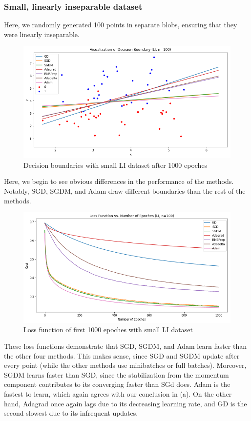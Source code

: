\documentclass[twoside,11pt]{homework}
\begin{document}
\subsubsection*{Small, linearly inseparable dataset}
Here, we randomly generated 100 points in separate blobs, ensuring that they were linearly inseparable.
\begin{figure}[H]
		\centering
		\includegraphics[scale=.5]{q5/insep_100/lines.png}
		\caption{Decision boundaries with small LI dataset after 1000 epoches}
	\end{figure}

Here, we begin to see obvious differences in the performance of the methods. Notably, SGD, SGDM, and Adam draw different boundaries than the rest of the methods.

	\begin{figure}[H]
		\centering
		\includegraphics[scale=.5]{q5/insep_100/loss.png}
		\caption{Loss function of first 1000 epoches with small LI dataset}
	\end{figure}

	These loss functions demonstrate that SGD, SGDM, and Adam learn faster than the other four methods. This makes sense, since SGD and SGDM update after every point (while the other methods use minibatches or full batches). Moreover, SGDM learns faster than SGD, since the stabilization from the momentum component contributes to its converging faster than SGd does. Adam is the fastest to learn, which again agrees with our conclusion in (a). On the other hand, Adagrad once again lags due to its decreasing learning rate, and GD is the second slowest due to its infrequent updates.
\end{document}
